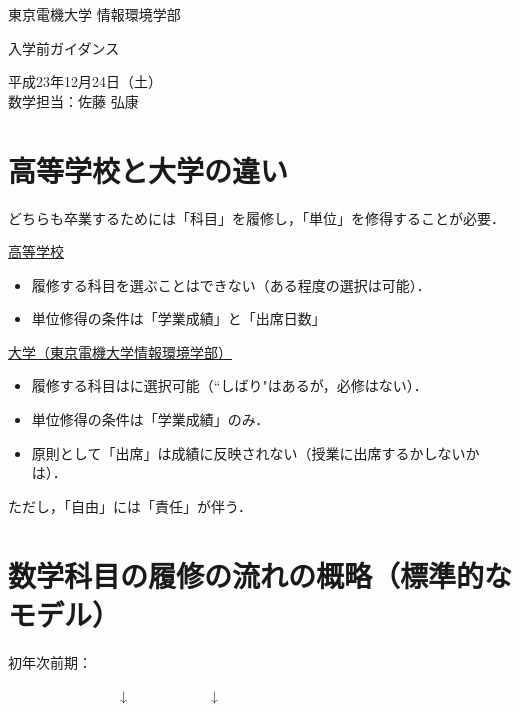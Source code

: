 \documentclass[a4j,landscape,25pt]{jsarticle}
\begin{document}
\thispagestyle{empty}
\vspace*{30pt}
\begin{center}
{\small 東京電機大学 情報環境学部}
\vspace{15pt}

{\large 入学前ガイダンス}
\vspace{45pt}

{\footnotesize 
平成23年12月24日（土）\\
数学担当：佐藤 弘康
}
\end{center}

\section{高等学校と大学の違い}

\noindent どちらも卒業するためには「科目」を履修し，「単位」を修得することが必要．

\underline{高等学校}\vspace{-5pt}
\begin{itemize}
\item 履修する科目を選ぶことはできない（ある程度の選択は可能）．
\item 単位修得の条件は「学業成績」と「出席日数」
\end{itemize}\pause

\underline{大学（東京電機大学情報環境学部）}\vspace{-5pt}
\begin{itemize}
\item 履修する科目は{\color{blue}{自由}}に選択可能（``しばり"はあるが，必修はない）．
\item 単位修得の条件は「学業成績」のみ．
\item 原則として「出席」は成績に反映されない（授業に出席するかしないかは{\color{blue}{自由}}）．
\end{itemize}\pause

\begin{center}
{\large ただし，「自由」には「責任」が伴う．}
\end{center}

\section{数学科目の履修の流れの概略（標準的なモデル）}

初年次前期：\hspace{25pt}

　　　　　　　　↓　　　　　　\hspace{3.5pt}↓
\end{document}
